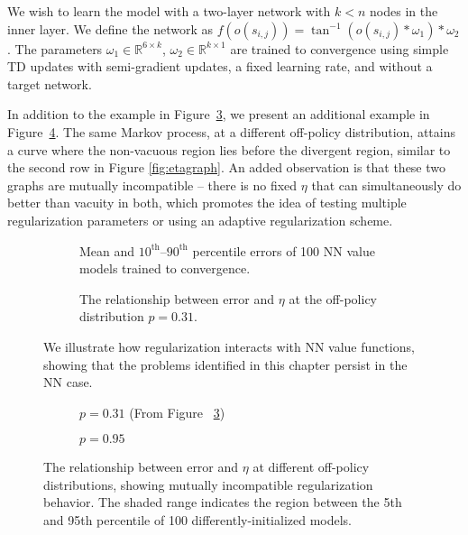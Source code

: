 We wish to learn the model with a two-layer network with $k < n$ nodes in the inner layer.
We define the network as $f(o(s_{i,j})) = \tan^{-1}(o(s_{i, j}) * \omega_1) * \omega_2$. The parameters $\omega_1 \in \mathbb R^{6\times k}$, $\omega_2 \in \mathbb R^{k \times 1}$ are trained to convergence using simple TD updates with semi-gradient updates, a fixed learning rate, and without a target network.

In addition to the example in Figure~\ref{fig:mlperfeta}, we present an additional example in Figure~\ref{fig:twomultilayerperfs}. The same Markov process, at a different off-policy distribution, attains a curve where the non-vacuous region lies before the divergent region, similar to the second row in Figure \ref{fig:etagraph}. An added observation is that these two graphs are mutually incompatible -- there is no fixed $\eta$ that can simultaneously do better than vacuity in both, which promotes the idea of testing multiple regularization parameters or using an adaptive regularization scheme.

\begin{figure}
	\centering
	\begin{subfigure}[t]{0.8\columnwidth}
		\centering
		
		\caption{Mean and $10^\text{th}$--$90^\text{th}$ percentile errors of 100 NN value models trained to convergence. }\label{fig:mlperfdist}
	\end{subfigure}

	\begin{subfigure}[t]{0.8\columnwidth}
		\centering
		
		\caption{The relationship between error and $\eta$ at the off-policy distribution $p=0.31$. }\label{fig:mlperfeta}
	\end{subfigure}
	\caption{We illustrate how regularization interacts with NN value functions, showing that the problems identified in this chapter persist in the NN case. }
\end{figure}


\begin{figure}[b]
	\centering
	\begin{subfigure}[t]{0.8\columnwidth}
		\centering
		
		\caption{$p=0.31$ (From Figure~
			\ref{fig:mlperfeta})}
	\end{subfigure}
	\hfill
	\begin{subfigure}[t]{0.8\columnwidth}
		\centering
		
		\caption{$p=0.95$}
	\end{subfigure}
	\caption{The relationship between error and $\eta$ at different off-policy distributions, showing mutually incompatible regularization behavior. The shaded range indicates the region between the 5th and 95th percentile of 100 differently-initialized models. }
	\label{fig:twomultilayerperfs}
\end{figure}



